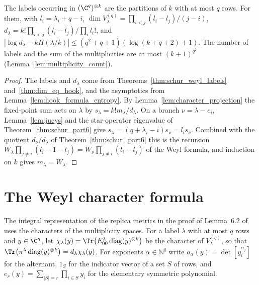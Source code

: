 \begin{theorem}
    \label{thm:schur_part1_dim}
    \leanok
    The labels occurring in $(\C^q)^{\otimes k}$ are the partitions of $k$ with at most
    $q$ rows. For them, with $l_i=\lambda_i+q-i$,
    $\dim V^{(q)}_\lambda=\prod_{i<j}(l_i-l_j)/(j-i)$,
    $d_\lambda=k!\prod_{i<j}(l_i-l_j)/\prod_il_i!$, and
    $|\log d_\lambda-kH(\lambda/k)|\le(q^2+q+1)(\log(k+q+2)+1)$. The number of labels and
    the sum of the multiplicities are at most $(k+1)^{q^2}$ (Lemma~\ref{lem:multiplicity_count}).
\end{theorem}

\begin{proof}\leanok
    The labels and $d_\lambda$ come from Theorems~\ref{thm:schur_weyl_labels}
    and~\ref{thm:dim_eq_hook}, and the asymptotics from
    Lemma~\ref{lem:hook_formula_entropy}. By Lemma~\ref{lem:character_projection} the
    fixed-point sum acts on $\lambda$ by $s_\lambda=k!m_\lambda/d_\lambda$. On a branch
    $\nu=\lambda-e_i$, Lemma~\ref{lem:jucys} and the star-operator eigenvalue of
    Theorem~\ref{thm:schur_part6} give $s_\lambda=(q+\lambda_i-i)s_\nu=l_is_\nu$.
    Combined with the quotient $d_\nu/d_\lambda$ of Theorem~\ref{thm:schur_part6} this
    is the recursion $W_\lambda\prod_{j\ne i}(l_i-1-l_j)=W_\nu\prod_{j\ne i}(l_i-l_j)$ of the
    Weyl formula, and induction on $k$ gives $m_\lambda=W_\lambda$.
\end{proof}

\section{The Weyl character formula}

The integral representation of the replica metrics in the proof of Lemma~6.2
of~\cite{OpenAI2026AreaLaw} uses the characters of the multiplicity spaces. For a label
$\lambda$ with at most $q$ rows and $y\in\C^q$, let
$\chi_\lambda(y)=\Tr\bigl(E^\lambda_{00}\operatorname{diag}(y)^{\otimes k}\bigr)$ be the
character of $V^{(q)}_\lambda$, so that
$\Tr\bigl(\pi^\lambda\operatorname{diag}(y)^{\otimes k}\bigr)=d_\lambda\chi_\lambda(y)$. For
exponents $\alpha\in\mathbb N^q$ write $a_\alpha(y)=\det[y_i^{\alpha_j}]$ for the alternant,
$1_S$ for the indicator vector of a set $S$ of rows, and
$e_r(y)=\sum_{|S|=r}\prod_{i\in S}y_i$ for the elementary symmetric polynomial.

